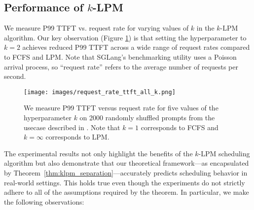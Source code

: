 \subsection{Performance of $k$-LPM}

We measure P99 TTFT vs. request rate for varying values of $k$ in the $k$-LPM algorithm. Our key observation (Figure \ref{fig:request_rate_ttft_all_k}) is that setting the hyperparameter to $k=2$ achieves reduced P99 TTFT across a wide range of request rates compared to FCFS and LPM. Note that SGLang's benchmarking utility uses a Poisson arrival process, so ``request rate'' refers to the average number of requests per second. 

\begin{figure}[ht]
    \centering
    \texttt{[image: images/request\_rate\_ttft\_all\_k.png]}
    \caption{We measure P99 TTFT versus request rate for five values of the hyperparameter $k$ on 2000 randomly shuffled prompts from the usecase described in \cite{360brew}. Note that $k=1$ corresponds to FCFS and $k=\infty$ corresponds to LPM.}
    \label{fig:request_rate_ttft_all_k}
\end{figure}

The experimental results not only highlight the benefits of the $k$-LPM scheduling algorithm but also demonstrate that our theoretical framework---as encapsulated by Theorem~\ref{thm:klpm_separation}---accurately predicts scheduling behavior in real-world settings. This holds true even though the experiments do not strictly adhere to all of the assumptions required by the theorem. In particular, we make the following observations:

